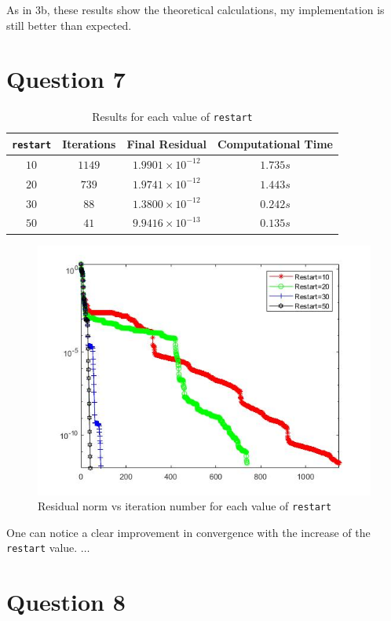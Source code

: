 \documentclass[a4paper, 11pt]{article}
\begin{document}
		As in 3b, these results show the theoretical calculations, my implementation is still better than expected.
		
		
		
		\section*{Question 7}
		
			\begin{table}[H]
				\centering
				\begin{tabular}{c|c|c|c}
					\texttt{\textbf{restart}} &  \textbf{Iterations} 	& \textbf{Final Residual} 		& \textbf{Computational Time} 	\\ \hline
					$ 10 $			& 			$1149$ 		& $ 1.9901 \times 10^{-12} $ 	& $ 1.735 s $	\\ \hline	
					$ 20 $			& 			$739$		& $ 1.9741 \times 10^{-12} $	& $ 1.443 s $	\\ \hline
					$ 30 $			& 			$88$ 		& $ 1.3800 \times 10^{-12} $ 	& $ 0.242 s $	\\ \hline	
					$ 50 $			& 			$41$		& $ 9.9416 \times 10^{-13} $	& $ 0.135 s $	\\ \hline
				\end{tabular}
				\caption{Results for each value of \texttt{restart}}
				\label{table:ex7}
			\end{table}
			
			\begin{figure}[H]
				\centering
				\includegraphics[width=.6\linewidth]{ex7.jpg}
				\caption{Residual norm vs iteration number for each value of \texttt{restart}}
				\label{fig:ex7}
			\end{figure}
			
			One can notice a clear improvement in convergence with the increase of the \texttt{restart} value.
			$\ldots$
		
		\section*{Question 8}
		
\end{document}
